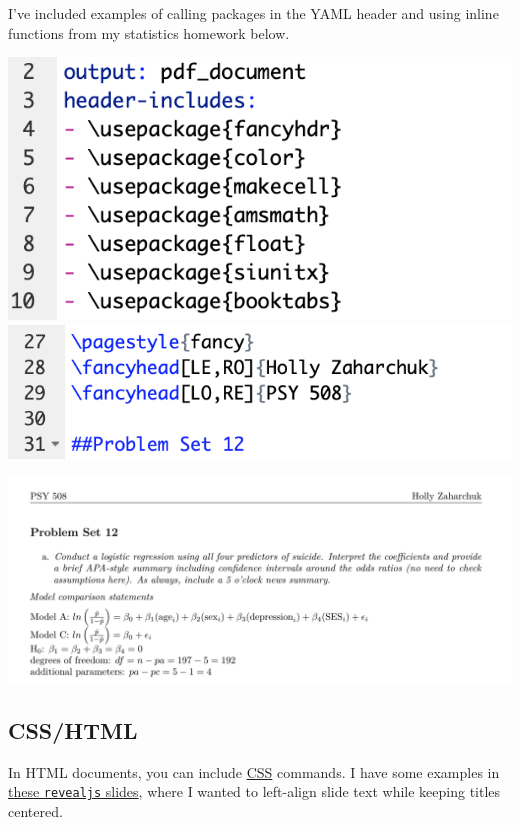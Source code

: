 \documentclass[
  openany]{book}
\begin{document}
I've included examples of calling packages in the YAML header and using inline functions from my statistics homework below.

\includegraphics[width=\textwidth]{images/latex_packages}
\includegraphics[width=\textwidth]{images/latex_calls}

\includegraphics[width=\textwidth]{images/latex_example}

\hypertarget{csshtml}{%
\subsection{CSS/HTML}\label{csshtml}}

In HTML documents, you can include \href{https://developer.mozilla.org/en-US/docs/Web/CSS}{CSS} commands. I have some examples in \href{https://github.com/hollzzar/markdown-tutorial/blob/master/brownbag_slides.Rmd}{these \texttt{revealjs} slides}, where I wanted to left-align slide text while keeping titles centered.
\end{document}
